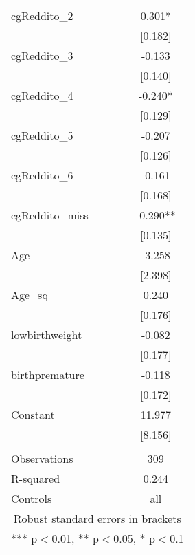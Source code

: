 \documentclass[]{article}
\begin{document}
\begin{tabular}{lc}
cgReddito\_2 & 0.301* \\
 & [0.182] \\
cgReddito\_3 & -0.133 \\
 & [0.140] \\
cgReddito\_4 & -0.240* \\
 & [0.129] \\
cgReddito\_5 & -0.207 \\
 & [0.126] \\
cgReddito\_6 & -0.161 \\
 & [0.168] \\
cgReddito\_miss & -0.290** \\
 & [0.135] \\
Age & -3.258 \\
 & [2.398] \\
Age\_sq & 0.240 \\
 & [0.176] \\
lowbirthweight & -0.082 \\
 & [0.177] \\
birthpremature & -0.118 \\
 & [0.172] \\
Constant & 11.977 \\
 & [8.156] \\
 &  \\
Observations & 309 \\
R-squared & 0.244 \\
 Controls & all \\ \hline
\multicolumn{2}{c}{ Robust standard errors in brackets} \\
\multicolumn{2}{c}{ *** p$<$0.01, ** p$<$0.05, * p$<$0.1} \\
\end{tabular}
\end{document}
